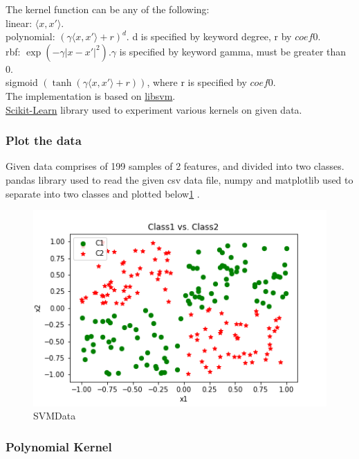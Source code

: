 \documentclass[10pt,a4paper]{article}
\begin{document}
The kernel function can be any of the following:\\
linear: $\langle x, x'\rangle$.\\
polynomial: $(\gamma \langle x, x'\rangle + r)^d$. d is specified by keyword degree, r by $coef0$.\\
rbf: $\exp(-\gamma |x-x'|^2). \gamma$ is specified by keyword gamma, must be greater than 0.\\
sigmoid $(\tanh(\gamma \langle x,x'\rangle + r))$, where r is specified by $coef0$.\\

The implementation is based on \href{http://www.csie.ntu.edu.tw/~cjlin/papers/libsvm.pdf}{libsvm}. \\ \href{http://scikit-learn.org/stable/modules/generated/sklearn.svm.SVC.html}{Scikit-Learn} library used to experiment various kernels on given data. 
\subsubsection{Plot the data}
Given data comprises of 199 samples of 2 features, and divided into two classes. pandas library used to read the given csv data file, numpy and matplotlib used to separate into two classes and plotted below\ref{fig:C12T1} .  
\graphicspath{ {/images/} }
\begin{figure}[!h]
\includegraphics[scale=0.75]{images/P2/P2_SVMData_C1C2.png}
  \caption{SVMData}
  \label{fig:C12T1}
\end{figure}
\clearpage
\subsubsection{Polynomial Kernel}
\end{document}
